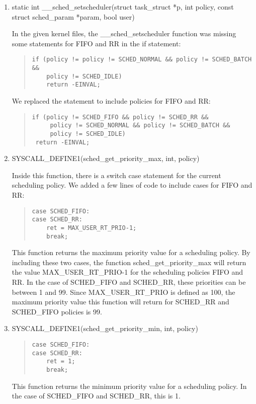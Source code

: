 \documentclass[letterpaper,10pt,titlepage]{article}
\begin{document}
\begin{enumerate}
\item static int \_\_sched\_setscheduler(struct task\_struct *p, int policy, const struct sched\_param *param, bool user)

 In the given kernel files, the \_\_sched\_setscheduler function was missing some statements for FIFO and RR in the if statement:
\begin{quotation}
\begin{verbatim}
if (policy != policy != SCHED_NORMAL && policy != SCHED_BATCH &&
    policy != SCHED_IDLE)
    return -EINVAL;
\end{verbatim}
\end{quotation}

We replaced the statement to include policies for FIFO and RR:
\begin{quotation}
\begin{verbatim}
if (policy != SCHED_FIFO && policy != SCHED_RR &&
     policy != SCHED_NORMAL && policy != SCHED_BATCH &&
     policy != SCHED_IDLE)
 return -EINVAL;
\end{verbatim}
\end{quotation}

\item SYSCALL\_DEFINE1(sched\_get\_priority\_max, int, policy)

Inside this function, there is a switch case statement for the current scheduling policy. We added a few lines of code to include cases for FIFO and RR:
\begin{quotation}
\begin{verbatim}
case SCHED_FIFO:
case SCHED_RR:
    ret = MAX_USER_RT_PRIO-1;
    break;
\end{verbatim}
\end{quotation}
  
This function returns the maximum priority value for a scheduling policy. By including these two cases, the function sched\_get\_priority\_max will return the value MAX\_USER\_RT\_PRIO-1 for the scheduling policies FIFO and RR. In the case of SCHED\_FIFO and SCHED\_RR, these priorities can be between 1 and 99. Since MAX\_USER\_RT\_PRIO is defined as 100, the maximum priority value this function will return for SCHED\_RR and SCHED\_FIFO policies is 99. 

\newpage
\item SYSCALL\_DEFINE1(sched\_get\_priority\_min, int, policy)


\begin{quotation}
\begin{verbatim}
case SCHED_FIFO:
case SCHED_RR:
    ret = 1;
    break;
\end{verbatim}
\end{quotation}
This function returns the minimum priority value for a scheduling policy. In the case of SCHED\_FIFO and SCHED\_RR, this is 1.
\end{enumerate}
\end{document}

